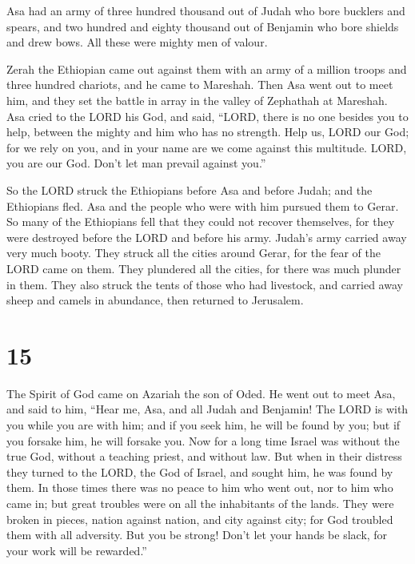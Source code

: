  Asa had an army of three hundred thousand out of Judah who
bore bucklers and spears, and two hundred and eighty thousand out of
Benjamin who bore shields and drew bows. All these were mighty men of
valour.

 Zerah the Ethiopian came out against them with an army of a
million troops and three hundred chariots, and he came to Mareshah.
 Then Asa went out to meet him, and they set the battle in
array in the valley of Zephathah at Mareshah.  Asa cried to
the LORD his God, and said, ``LORD, there is no one besides you to help,
between the mighty and him who has no strength. Help us, LORD our God;
for we rely on you, and in your name are we come against this multitude.
LORD, you are our God. Don't let man prevail against you.''

 So the LORD struck the Ethiopians before Asa and before
Judah; and the Ethiopians fled.  Asa and the people who
were with him pursued them to Gerar. So many of the Ethiopians fell that
they could not recover themselves, for they were destroyed before the
LORD and before his army. Judah's army carried away very much booty.
 They struck all the cities around Gerar, for the fear of
the LORD came on them. They plundered all the cities, for there was much
plunder in them.  They also struck the tents of those who
had livestock, and carried away sheep and camels in abundance, then
returned to Jerusalem.

\hypertarget{section-14}{%
\section{15}\label{section-14}}

 The Spirit of God came on Azariah the son of Oded.
 He went out to meet Asa, and said to him, ``Hear me, Asa,
and all Judah and Benjamin! The LORD is with you while you are with him;
and if you seek him, he will be found by you; but if you forsake him, he
will forsake you.  Now for a long time Israel was without
the true God, without a teaching priest, and without law. 
But when in their distress they turned to the LORD, the God of Israel,
and sought him, he was found by them.  In those times there
was no peace to him who went out, nor to him who came in; but great
troubles were on all the inhabitants of the lands.  They
were broken in pieces, nation against nation, and city against city; for
God troubled them with all adversity.  But you be strong!
Don't let your hands be slack, for your work will be rewarded.''

